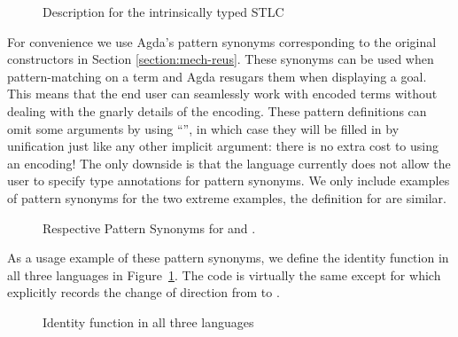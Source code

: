 \begin{figure}[h]
\begin{minipage}{0.4\textwidth}
\end{minipage}\hfill
\begin{minipage}{0.5\textwidth}
\end{minipage}
  \caption{Description for the intrinsically typed STLC}
\end{figure}

For convenience we use Agda's pattern synonyms corresponding to the
original constructors in Section \ref{section:mech-reus}. These
synonyms can be used when pattern-matching on a term and Agda resugars
them when displaying a goal. This means that the end user can
seamlessly work with encoded terms without dealing with the gnarly
details of the encoding.  These pattern definitions can omit some
arguments by using ``\AS{\_}'', in which case they will be filled in
by unification just like any other implicit argument: there is no
extra cost to using an encoding!  The only downside is that the
language currently does not allow the user to specify type annotations
for pattern synonyms. We only include examples of pattern synonyms
for the two extreme examples, the definition for  are similar.

\begin{figure}[h]
\begin{minipage}{0.40\textwidth}
\end{minipage}\hspace{2em}
\begin{minipage}{0.50\textwidth}
\end{minipage}
\caption{Respective Pattern Synonyms for  and .}
\end{figure}

As a usage example of these pattern synonyms, we define the identity
function in all three languages in Figure~\ref{fig:identity}. The code
is virtually the same except for  which explicitly records 
the change of direction from  to .

\begin{figure}[h]
\begin{minipage}{0.28\textwidth}
\end{minipage}\hfill
\begin{minipage}{0.30\textwidth}
\end{minipage}\hfill
\begin{minipage}{0.32\textwidth}
\end{minipage}
\caption{Identity function in all three languages}\label{fig:identity}
\end{figure}

